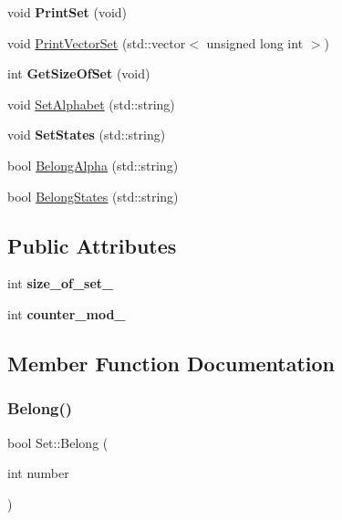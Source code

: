 \begin{DoxyCompactItemize}
\item 
\mbox{\label{classSet_a1440c7bdad66b1864b41b4aafb188245}} 
void {\bfseries Print\+Set} (void)
\item 
void \hyperlink{classSet_a167b6d87b1698a61f269835c34c455cc}{Print\+Vector\+Set} (std\+::vector$<$ unsigned long int $>$)
\item 
\mbox{\label{classSet_a6c55977d6e5c48ab791bbe49e832c5ba}} 
int {\bfseries Get\+Size\+Of\+Set} (void)
\item 
void \hyperlink{classSet_abd4f422aa428bed3afba157f4a18c90f}{Set\+Alphabet} (std\+::string)
\item 
\mbox{\label{classSet_acd8545ba5646eb4be510a19a17dd78e4}} 
void {\bfseries Set\+States} (std\+::string)
\item 
bool \hyperlink{classSet_a80ff19b9d44830084708478bac29231b}{Belong\+Alpha} (std\+::string)
\item 
bool \hyperlink{classSet_a8300b84ddc30a216c3e2d1b467e606bc}{Belong\+States} (std\+::string)
\end{DoxyCompactItemize}
\subsection*{Public Attributes}
\begin{DoxyCompactItemize}
\item 
\mbox{\label{classSet_a22a8ef647115a534ffba7bac30e44676}} 
int {\bfseries size\+\_\+of\+\_\+set\+\_\+}
\item 
\mbox{\label{classSet_a9c6f21f89012e343006db3672289728d}} 
int {\bfseries counter\+\_\+mod\+\_\+}
\end{DoxyCompactItemize}


\subsection{Member Function Documentation}
\mbox{\label{classSet_a8fb9899afe9a09628706cf539cc75a1c}} 
\subsubsection{\texorpdfstring{Belong()}{Belong()}}
{\footnotesize\ttfamily bool Set\+::\+Belong (\begin{DoxyParamCaption}\item[{int}]{number }\end{DoxyParamCaption})}

